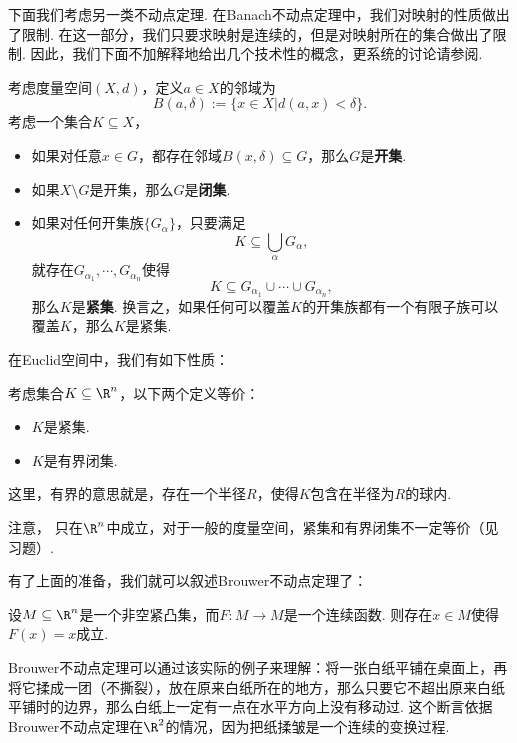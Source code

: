 下面我们考虑另一类不动点定理. 在Banach不动点定理中，我们对映射的性质做出了限制. 在这一部分，我们只要求映射是连续的，但是对映射所在的集合做出了限制. 因此，我们下面不加解释地给出几个技术性的概念，更系统的讨论请参阅.

\begin{definition}[开集、闭集和紧集]
    考虑度量空间$(X,d)$，定义$a\in X$的邻域为
    \[B(a,\delta):=\{x\in X|d(a,x)<\delta\}.\]
    考虑一个集合$K\subseteq X$，
\begin{itemize}
    \item 如果对任意$x\in G$，都存在邻域$B(x,\delta)\subseteq G$，那么$G$是\textbf{开集}.
    \item 如果$X\setminus G$是开集，那么$G$是\textbf{闭集}.
    \item 如果对任何开集族$\{G_\alpha\}$，只要满足
    \[K\subseteq \bigcup_\alpha G_\alpha,\]
    就存在$G_{\alpha_1},\cdots,G_{\alpha_n}$使得
    \[K\subseteq G_{\alpha_1}\cup\cdots\cup G_{\alpha_n},\]
    那么$K$是\textbf{紧集}. 换言之，如果任何可以覆盖$K$的开集族都有一个有限子族可以覆盖$K$，那么$K$是紧集.
\end{itemize}
\end{definition}

在Euclid空间中，我们有如下性质：

\begin{theorem}\label{thm:compact-set-iff-bounded-closed}
    考虑集合$K\subseteq\R^n$，以下两个定义等价：
    \begin{itemize}
        \item $K$是紧集.
        \item $K$是有界闭集.
    \end{itemize}
\end{theorem}
这里，有界的意思就是，存在一个半径$R$，使得$K$包含在半径为$R$的球内. 

注意， 只在$\R^n$中成立，对于一般的度量空间，紧集和有界闭集不一定等价（见习题）.

有了上面的准备，我们就可以叙述Brouwer不动点定理了：

\begin{theorem}[Brouwer不动点定理]
    设$M\subseteq\R^n$是一个非空紧凸集，而$F:M\to M$是一个连续函数. 则存在$x\in M$使得$F(x)=x$成立.
\end{theorem}

Brouwer不动点定理可以通过该实际的例子来理解：将一张白纸平铺在桌面上，再将它揉成一团（不撕裂），放在原来白纸所在的地方，那么只要它不超出原来白纸平铺时的边界，那么白纸上一定有一点在水平方向上没有移动过. 这个断言依据Brouwer不动点定理在$\R^2$的情况，因为把纸揉皱是一个连续的变换过程.

